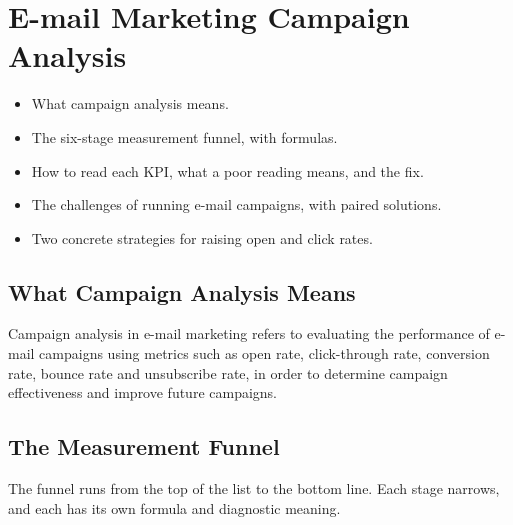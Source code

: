 \chapter{E-mail Marketing Campaign Analysis}


\begin{learningoutcomes}
\begin{itemize}
\item What campaign analysis means.
\item The six-stage measurement funnel, with formulas.
\item How to read each KPI, what a poor reading means, and the fix.
\item The challenges of running e-mail campaigns, with paired solutions.
\item Two concrete strategies for raising open and click rates.
\end{itemize}
\end{learningoutcomes}

\section{What Campaign Analysis Means}

\begin{exambox}
Campaign analysis in e-mail marketing refers to evaluating the performance of
e-mail campaigns using metrics such as open rate, click-through rate, conversion
rate, bounce rate and unsubscribe rate, in order to determine campaign
effectiveness and improve future campaigns.
\end{exambox}

\section{The Measurement Funnel}

The funnel runs from the top of the list to the bottom line. Each stage narrows,
and each has its own formula and diagnostic meaning.

